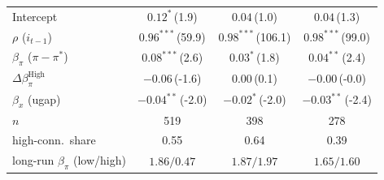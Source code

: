 \begin{tabular}{lccc}
Intercept & $0.12^{*}$\,{\scriptsize(1.9)} & $0.04$\,{\scriptsize(1.0)} & $0.04$\,{\scriptsize(1.3)} \\
$\rho$ ($i_{t-1}$) & $0.96^{***}$\,{\scriptsize(59.9)} & $0.98^{***}$\,{\scriptsize(106.1)} & $0.98^{***}$\,{\scriptsize(99.0)} \\
$\beta_\pi$ ($\pi-\pi^*$) & $0.08^{***}$\,{\scriptsize(2.6)} & $0.03^{*}$\,{\scriptsize(1.8)} & $0.04^{**}$\,{\scriptsize(2.4)} \\
$\Delta\beta_\pi^{\text{High}}$ & $-0.06$\,{\scriptsize(-1.6)} & $0.00$\,{\scriptsize(0.1)} & $-0.00$\,{\scriptsize(-0.0)} \\
$\beta_x$ (ugap) & $-0.04^{**}$\,{\scriptsize(-2.0)} & $-0.02^{*}$\,{\scriptsize(-2.0)} & $-0.03^{**}$\,{\scriptsize(-2.4)} \\
\addlinespace
$n$ & 519 & 398 & 278 \\
high-conn.\ share & 0.55 & 0.64 & 0.39 \\
long-run $\beta_\pi$ (low/high) & $1.86/0.47$ & $1.87/1.97$ & $1.65/1.60$ \\
\bottomrule
\end{tabular}
